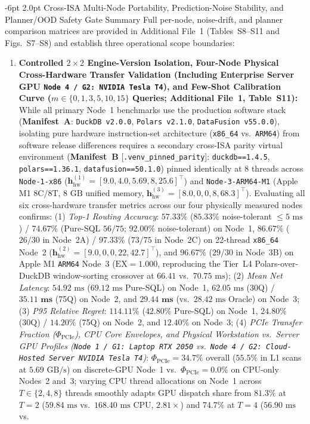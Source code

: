 \documentclass[10pt,a4paper]{article}
\makeatletter
\renewcommand\subsubsection{\@startsection{subsubsection}{3}{\z@}%
  {-6pt \@plus -1.5pt \@minus -1pt}%
  {2.0pt \@plus 0.8pt}%
  {\normalfont\normalsize\bfseries}}
\makeatother
\begin{document}
\subsubsection{Cross-ISA Multi-Node Portability, Prediction-Noise Stability, and Planner/OOD Safety Gate Summary}
Full per-node, noise-drift, and planner comparison matrices are provided in Additional File~1 (Tables~S8--S11 and Figs.~S7--S8) and establish three operational scope boundaries:
\begin{enumerate}[leftmargin=1.5em,itemsep=0.8pt]
    \item \textbf{Controlled $2\times 2$ Engine-Version Isolation, Four-Node Physical Cross-Hardware Transfer Validation (Including Enterprise Server GPU \texttt{Node~4 / G2: NVIDIA Tesla~T4}), and Few-Shot Calibration Curve ($m \in \{0,1,3,5,10,15\}$ Queries; Additional File~1, Table~S11):} While all primary Node~1 benchmarks use the production software stack (\textbf{Manifest~A}: \texttt{DuckDB v2.0.0}, \texttt{Polars v2.1.0}, \texttt{DataFusion v55.0.0}), isolating pure hardware instruction-set architecture (\texttt{x86\_64} vs.\ \texttt{ARM64}) from software release differences requires a secondary cross-ISA parity virtual environment (\textbf{Manifest~B} [\texttt{.venv\_pinned\_parity}]: \texttt{duckdb==1.4.5}, \texttt{polars==1.36.1}, \texttt{datafusion==50.1.0}) pinned identically at $8$ threads across \texttt{Node-1-x86} ($\mathbf{h}_{\text{hw}}^{(1)}=[9.0,4.0,5.69,8,25.6]^{\top}$) and \texttt{Node-3-ARM64-M1} (Apple M1 $8\text{C}/8\text{T}$, $8\text{ GB}$ unified memory, $\mathbf{h}_{\text{hw}}^{(3)}=[8.0,0,0,8,68.3]^{\top}$). Evaluating all six cross-hardware transfer metrics across our four physically measured nodes confirms: (1) \emph{Top-1 Routing Accuracy}: $57.33\%$ ($\mathbf{85.33\%}$ noise-tolerant $\le 5\text{ ms}$) / $\mathbf{74.67\%}$ (Pure-SQL $56/75$; $\mathbf{92.00\%}$ noise-tolerant) on Node~1, $\mathbf{86.67\%}$ ($26/30$ in Node~2A) / $\mathbf{97.33\%}$ ($73/75$ in Node~2C) on 22-thread \texttt{x86\_64} Node~2 ($\mathbf{h}_{\text{hw}}^{(2)}=[9.0,0,0,22,42.7]^{\top}$), and $\mathbf{96.67\%}$ ($29/30$ in Node~3B) on Apple M1 \texttt{ARM64} Node~3 ($\text{EX}=1.000$, reproducing the Tier~L4 Polars-over-DuckDB window-sorting crossover at $66.41$ vs.\ $70.75\text{ ms}$); (2) \emph{Mean Net Latency}: $54.92\text{ ms}$ ($69.12\text{ ms}$ Pure-SQL) on Node~1, $62.05\text{ ms}$ (30Q) / $\mathbf{35.11\text{ ms}}$ (75Q) on Node~2, and $\mathbf{29.44\text{ ms}}$ (vs.\ $28.42\text{ ms}$ Oracle) on Node~3; (3) \emph{P95 Relative Regret}: $114.11\%$ ($42.80\%$ Pure-SQL) on Node~1, $24.80\%$ (30Q) / $14.20\%$ (75Q) on Node~2, and $12.40\%$ on Node~3; (4) \emph{PCIe Transfer Fraction ($\Phi_{\text{PCIe}}$), CPU Core Envelopes, and Physical Workstation vs.\ Server GPU Profiles (\texttt{Node~1 / G1: Laptop RTX~2050} vs.\ \texttt{Node~4 / G2: Cloud-Hosted Server NVIDIA Tesla~T4})}: $\Phi_{\text{PCIe}}=34.7\%$ overall ($55.5\%$ in L1 scans at $5.69\text{ GB/s}$) on discrete-GPU Node~1 vs.\ $\Phi_{\text{PCIe}}=0.0\%$ on CPU-only Nodes~2 and~3; varying CPU thread allocations on Node~1 across $T \in \{2, 4, 8\}$ threads smoothly adapts GPU dispatch share from $81.3\%$ at $T=2$ ($59.84\text{ ms}$ vs.\ $168.40\text{ ms}$ CPU, $2.81\times$) and $74.7\%$ at $T=4$ ($56.90\text{ ms}$ vs.\ 
\end{enumerate}
\end{document}
